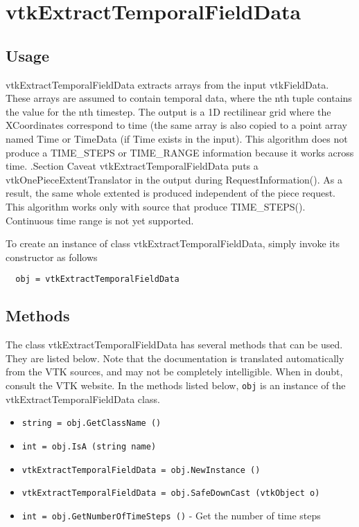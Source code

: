 \section{vtkExtractTemporalFieldData}

\subsection{Usage}

 vtkExtractTemporalFieldData extracts arrays from the input vtkFieldData. 
 These arrays are assumed to contain temporal data, where the nth tuple 
 contains the value for the nth timestep. 
 The output is a 1D rectilinear grid where the 
 XCoordinates correspond to time (the same array is also copied to
 a point array named Time or TimeData (if Time exists in the input).
 This algorithm does not produce a TIME\_STEPS or TIME\_RANGE information
 because it works across time. 
 .Section Caveat
 vtkExtractTemporalFieldData puts a vtkOnePieceExtentTranslator in the
 output during RequestInformation(). As a result, the same whole 
 extented is produced independent of the piece request.
 This algorithm works only with source that produce TIME\_STEPS().
 Continuous time range is not yet supported.

To create an instance of class vtkExtractTemporalFieldData, simply
invoke its constructor as follows
\begin{verbatim}
  obj = vtkExtractTemporalFieldData
\end{verbatim}
\subsection{Methods}

The class vtkExtractTemporalFieldData has several methods that can be used.
  They are listed below.
Note that the documentation is translated automatically from the VTK sources,
and may not be completely intelligible.  When in doubt, consult the VTK website.
In the methods listed below, \verb|obj| is an instance of the vtkExtractTemporalFieldData class.
\begin{itemize}
\item  \verb|string = obj.GetClassName ()|

\item  \verb|int = obj.IsA (string name)|

\item  \verb|vtkExtractTemporalFieldData = obj.NewInstance ()|

\item  \verb|vtkExtractTemporalFieldData = obj.SafeDownCast (vtkObject o)|

\item  \verb|int = obj.GetNumberOfTimeSteps ()| -  Get the number of time steps

\end{itemize}
